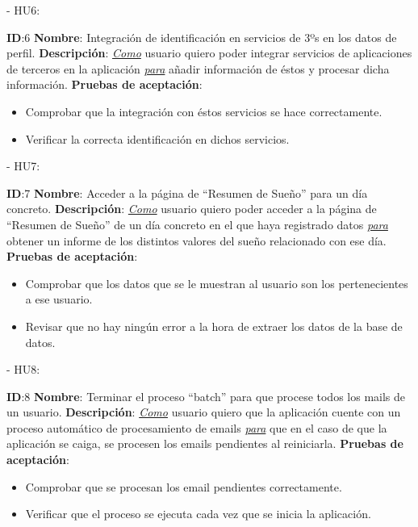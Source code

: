 \documentclass[11pt,openany]{book}
\begin{document}
- HU6:
 
\textbf{ID}:6 \textbf{Nombre}: Integración de identificación en servicios de 3ºs en los datos de perfil.\linebreak
\textbf{Descripción}: \textit{\underline{Como}} usuario quiero poder integrar servicios de aplicaciones de terceros en la aplicación \textit{\underline{para}} añadir información de éstos y procesar dicha información.\linebreak
\textbf{Pruebas de aceptación}:
\begin{itemize}
\item Comprobar que la integración con éstos servicios se hace correctamente.
\item Verificar la correcta identificación en dichos servicios.
\end{itemize}
 
 
- HU7:
 
\textbf{ID}:7 \textbf{Nombre}: Acceder a la página de ``Resumen de Sueño'' para un día concreto.\linebreak
\textbf{Descripción}: \textit{\underline{Como}} usuario quiero poder acceder a la página de “Resumen de Sueño” de un día concreto en el que haya registrado datos \textit{\underline{para}} obtener un informe de los distintos valores del sueño relacionado con ese día.\linebreak
\textbf{Pruebas de aceptación}:
\begin{itemize}
\item Comprobar que los datos que se le muestran al usuario son los pertenecientes a ese usuario.
\item Revisar que no hay ningún error a la hora de extraer los datos de la base de datos.
\end{itemize}
 
- HU8:
 
\textbf{ID}:8 \textbf{Nombre}: Terminar el proceso ``batch'' para que procese todos los mails de un usuario.\linebreak
\textbf{Descripción}: \textit{\underline{Como}} usuario quiero que la aplicación cuente con un proceso automático de procesamiento de emails \textit{\underline{para}} que en el caso de que la aplicación se caiga, se procesen los emails pendientes al reiniciarla.\linebreak
\textbf{Pruebas de aceptación}:
\begin{itemize}
\item Comprobar que se procesan los email pendientes correctamente.
\item Verificar que el proceso se ejecuta cada vez que se inicia la aplicación.
\end{itemize}
\end{document}
